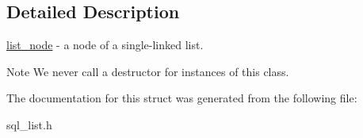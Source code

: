 \subsection{Detailed Description}
\mbox{\hyperlink{structlist__node}{list\+\_\+node}} -\/ a node of a single-\/linked list. \begin{DoxyNote}{Note}
We never call a destructor for instances of this class. 
\end{DoxyNote}


The documentation for this struct was generated from the following file\+:\begin{DoxyCompactItemize}
\item 
sql\+\_\+list.\+h\end{DoxyCompactItemize}
